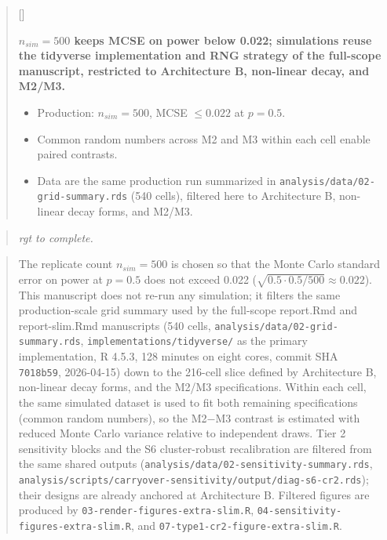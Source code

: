 \documentclass[
  11pt,
]{article}
\newcounter{pgraph}
\newenvironment{bullets}{%
  \stepcounter{pgraph}%
  \begin{quote}\small\sffamily\color[gray]{0.30}%
  {\normalfont\scriptsize\color[gray]{0.58}[\thepgraph]\enspace}}{%
  \end{quote}}
\newenvironment{rgt}{%
  \begin{quote}\small\itshape\color[RGB]{20,60,160}}{%
  \end{quote}}
\newenvironment{orig}{%
  \begin{quote}\normalsize\color[gray]{0.55}}{%
  \end{quote}}
\begin{document}
\begin{bullets}

\textbf{$n_{sim} = 500$ keeps MCSE on power below 0.022; simulations
reuse the tidyverse implementation and RNG strategy of the full-scope
manuscript, restricted to Architecture B, non-linear decay, and
M2/M3.}

\begin{itemize}\setlength{\itemsep}{2pt}\setlength{\parskip}{0pt}
\item Production: $n_{sim} = 500$, MCSE $\leq 0.022$ at $p = 0.5$.
\item Common random numbers across M2 and M3 within each cell enable
paired contrasts.
\item Data are the same production run summarized in
\texttt{analysis/data/02-grid-summary.rds} (540 cells), filtered here
to Architecture B, non-linear decay forms, and M2/M3.
\end{itemize}

\end{bullets}

\begin{rgt}
rgt to complete.

\end{rgt}

\begin{orig}
The replicate count \(n_{sim} = 500\) is chosen so that the Monte Carlo
standard error on power at \(p = 0.5\) does not exceed 0.022
(\(\sqrt{0.5 \cdot 0.5 / 500} \approx 0.022\)). This manuscript does not
re-run any simulation; it filters the same production-scale grid
summary used by the full-scope report.Rmd and report-slim.Rmd
manuscripts (540 cells, \texttt{analysis/data/02-grid-summary.rds},
\texttt{implementations/tidyverse/} as the primary implementation, R 4.5.3,
128 minutes on eight cores, commit SHA \texttt{7018b59}, 2026-04-15) down to
the 216-cell slice defined by Architecture B, non-linear decay forms,
and the M2/M3 specifications. Within each cell, the same simulated
dataset is used to fit both remaining specifications (common random
numbers), so the M2\(-\)M3 contrast is estimated with reduced Monte
Carlo variance relative to independent draws. Tier 2 sensitivity
blocks and the S6 cluster-robust recalibration are filtered from the
same shared outputs (\texttt{analysis/data/02-sensitivity-summary.rds},
\texttt{analysis/scripts/carryover-sensitivity/output/diag-s6-cr2.rds});
their designs are already anchored at Architecture B. Filtered
figures are produced by \texttt{03-render-figures-extra-slim.R},
\texttt{04-sensitivity-figures-extra-slim.R}, and
\texttt{07-type1-cr2-figure-extra-slim.R}.

\end{orig}
\end{document}
